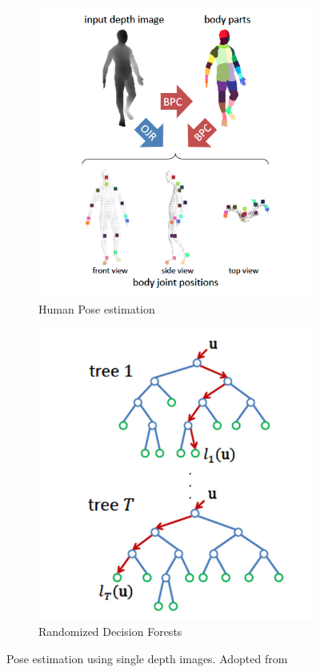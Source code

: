 \begin{figure}[H]
\centering
\begin{subfigure}[b]{0.35\textwidth}
\includegraphics[width=\textwidth]{assets/kinect_approaches.png}
\caption{Human Pose estimation}
\label{fig:kinect_pose}
\end{subfigure}
\begin{subfigure}[b]{0.35\textwidth}
\includegraphics[width=\textwidth]{assets/forest.png}
\caption{Randomized Decision Forests}
\label{fig:decision_forests}
\end{subfigure}
\caption[Human pose estimation using single depth images]{Pose estimation using single depth images. {Adopted from \cite{Shotton2013}}}
\end{figure}
